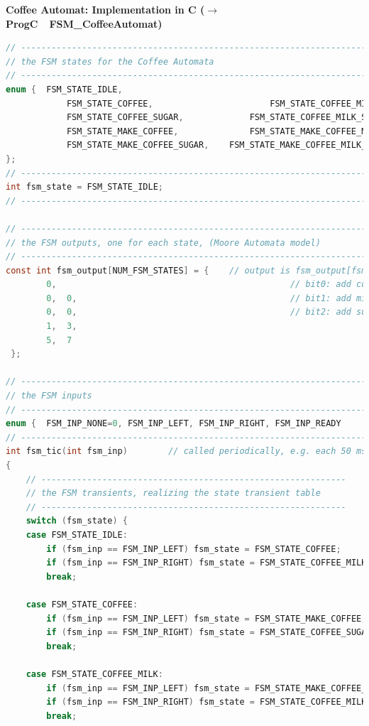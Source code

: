 \textbf{Coffee Automat: Implementation in C	 ($\rightarrow$ ProgC\ \ FSM\_CoffeeAutomat)}\\

\begin{lstlisting}[style=mystyle, language=c]
// ----------------------------------------------------------------------------
// the FSM states for the Coffee Automata
// ----------------------------------------------------------------------------
enum {	FSM_STATE_IDLE, 	
			FSM_STATE_COFFEE, 						FSM_STATE_COFFEE_MILK, 
			FSM_STATE_COFFEE_SUGAR, 			FSM_STATE_COFFEE_MILK_SUGAR, 
			FSM_STATE_MAKE_COFFEE, 				FSM_STATE_MAKE_COFFEE_MILK, 
			FSM_STATE_MAKE_COFFEE_SUGAR, 	FSM_STATE_MAKE_COFFEE_MILK_SUGAR, 
};
// ----------------------------------------------------------------------------
int fsm_state = FSM_STATE_IDLE;
// ----------------------------------------------------------------------------

// ----------------------------------------------------------------------------
// the FSM outputs, one for each state, (Moore Automata model)
// ----------------------------------------------------------------------------
const int fsm_output[NUM_FSM_STATES] = { 	// output is fsm_output[fsm_state]
		0,												// bit0: add coffee
		0,	0,											// bit1: add milk
		0,	0,											// bit2: add sugar
		1,	3,
		5,	7
 };

// ----------------------------------------------------------------------------
// the FSM inputs
// ----------------------------------------------------------------------------
enum {	FSM_INP_NONE=0, FSM_INP_LEFT, FSM_INP_RIGHT, FSM_INP_READY 
// ----------------------------------------------------------------------------
int fsm_tic(int fsm_inp) 		// called periodically, e.g. each 50 ms
{
	// ------------------------------------------------------------
	// the FSM transients, realizing the state transient table
	// ------------------------------------------------------------
	switch (fsm_state) {
	case FSM_STATE_IDLE:
		if (fsm_inp == FSM_INP_LEFT) fsm_state = FSM_STATE_COFFEE;
		if (fsm_inp == FSM_INP_RIGHT) fsm_state = FSM_STATE_COFFEE_MILK;
		break;
		
	case FSM_STATE_COFFEE:
		if (fsm_inp == FSM_INP_LEFT) fsm_state = FSM_STATE_MAKE_COFFEE;
		if (fsm_inp == FSM_INP_RIGHT) fsm_state = FSM_STATE_COFFEE_SUGAR;
		break;

	case FSM_STATE_COFFEE_MILK:
		if (fsm_inp == FSM_INP_LEFT) fsm_state = FSM_STATE_MAKE_COFFEE_MILK;
		if (fsm_inp == FSM_INP_RIGHT) fsm_state = FSM_STATE_COFFEE_MILK_SUGAR;
		break;


\end{lstlisting}
